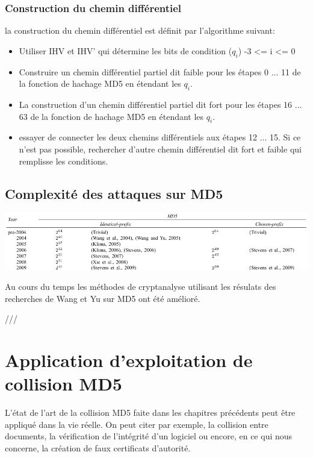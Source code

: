 \documentclass[a4paper,11pt,french]{article}
\begin{document}
\subsubsection{Construction du chemin différentiel}
la construction du chemin différentiel est définit par l'algorithme suivant: 
\begin{itemize}
  \item Utiliser IHV et IHV' qui détermine les bits de condition ($q_i$) -3 <= i <= 0
  \item Construire un chemin différentiel partiel dit faible pour les étapes 0 ... 11 de la fonction de hachage MD5 en étendant les $q_i$.
  \item La construction d'un chemin différentiel partiel dit fort pour les étapes 16 ... 63 de la fonction de hachage MD5 en étendant les $q_i$.
    \item essayer de connecter les deux chemins différentiels aux étapes 12 ... 15. Si ce n'est pas possible, rechercher d'autre chemin différentiel dit fort et faible qui remplisse les conditions.
\end{itemize}

\subsection{Complexité des attaques sur MD5}

\includegraphics[scale=.50]{./pics/complexite.png}

\vspace{.5cm}
Au cours du temps les méthodes de cryptanalyse utilisant les résulats des recherches de Wang et Yu sur MD5 ont été amélioré. 

///

\section{Application d'exploitation de collision MD5}

L'état de l'art de la collision MD5 faite dans les chapitres précédents peut être appliqué dans la vie réelle. On peut citer par exemple, la collision entre documents, la vérification de l'intégrité d'un logiciel ou encore, en ce qui nous concerne, la création de faux certificats d'autorité. \\
\end{document}
